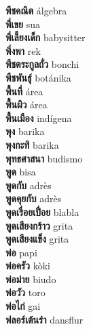 \textbf{ พีชคณิต  } álgebra \\
\textbf{ พี่เขย  } sua \\
\textbf{ พี่เลี้ยงเด็ก  } babysitter \\
\textbf{ พึ่งพา  } rek \\
\textbf{ พืชตระกูลถั่ว  } bonchi \\
\textbf{ พืชพันธุ์  } botánika \\
\textbf{ พื้นที่  } área \\
\textbf{ พื้นผิว  } área \\
\textbf{ พื้นเมือง  } indígena \\
\textbf{ พุง  } barika \\
\textbf{ พุงกะทิ  } barika \\
\textbf{ พุทธศาสนา  } budismo \\
\textbf{ พูด  } bisa \\
\textbf{ พูดกับ  } adrès \\
\textbf{ พูดคุยกับ  } adrès \\
\textbf{ พูดเรื่อยเปื่อย  } blabla \\
\textbf{ พูดเสียงกร้าว  } grita \\
\textbf{ พูดเสียงแข็ง  } grita \\
\textbf{ พ่อ  } papi \\
\textbf{ พ่อครัว  } kòki \\
\textbf{ พ่อม่าย  } biudo \\
\textbf{ พ่อวัว  } toro \\
\textbf{ พ่อไก่  } gai \\
\textbf{ ฟลอร์เต้นรำ  } dansflur \\
